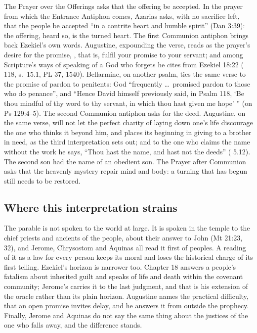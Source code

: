 The Prayer over the Offerings asks that the offering be accepted. In the prayer
from which the Entrance Antiphon comes, Azarias asks, with no sacrifice left,
that the people be accepted ``in a contrite heart and humble spirit'' (Dan
3:39): the offering, heard so, is the turned heart. The first
Communion antiphon brings back Ezekiel's own words. Augustine, expounding the
verse, reads  as the prayer's desire for the promise, , that is, fulfil your promise to your servant;
and among Scripture's ways of speaking of a God who forgets he cites
 from Ezekiel 18:22
( 118, s.~15.1, PL 37, 1540). Bellarmine, on
another psalm, ties the same verse to the promise of pardon to penitents: God
``frequently \ldots\ promised pardon to those who do penance'', and ``Hence David
himself previously said, in Psalm 118, `Be thou mindful of thy word to thy
servant, in which thou hast given me hope' '' (on Ps 129:4--5). The second
Communion antiphon asks for the deed. Augustine, on the same verse, will not
let the perfect charity of laying down one's life discourage the one who
thinks it beyond him, and places its beginning in giving to a brother in need,
as the third interpretation sets out; and to the one who claims the name
without the work he says, ``Thou hast the name, and hast not the deeds''
( 5.12). The second son had the name of an obedient son. The
Prayer after Communion asks that the heavenly mystery repair mind and body: a
turning that has begun still needs to be restored.

\subsection{Where this interpretation strains}

The parable is not spoken to the world at large. It is spoken in the temple to
the chief priests and ancients of the people, about their answer to John
(Mt 21:23, 32), and Jerome, Chrysostom and Aquinas all read it first of peoples.
A reading of it as a law for every person keeps its moral and loses the
historical charge of its first telling.
Ezekiel's horizon is narrower too. Chapter 18 answers a people's fatalism about
inherited guilt and speaks of life and death within the covenant community;
Jerome's  carries it to
the last judgment, and that is his extension of the oracle rather than its
plain horizon. Augustine names the practical difficulty, that an open promise
invites delay, and he answers it from outside the prophecy. Finally, Jerome and
Aquinas do not say the same thing about the justices of the one who falls away,
and the difference stands.

